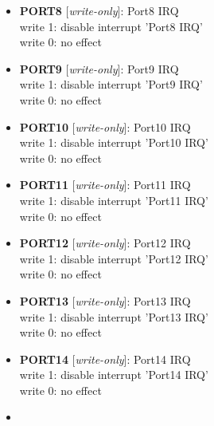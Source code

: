\begin{itemize}
\begin{small}
write 1: disable interrupt 'Port7 IRQ'\\write 0: no effect
\end{small}
\item \begin{small}
{\bf 
PORT8
} [\emph{write-only}]: Port8 IRQ
\\
write 1: disable interrupt 'Port8 IRQ'\\write 0: no effect
\end{small}
\item \begin{small}
{\bf 
PORT9
} [\emph{write-only}]: Port9 IRQ
\\
write 1: disable interrupt 'Port9 IRQ'\\write 0: no effect
\end{small}
\item \begin{small}
{\bf 
PORT10
} [\emph{write-only}]: Port10 IRQ
\\
write 1: disable interrupt 'Port10 IRQ'\\write 0: no effect
\end{small}
\item \begin{small}
{\bf 
PORT11
} [\emph{write-only}]: Port11 IRQ
\\
write 1: disable interrupt 'Port11 IRQ'\\write 0: no effect
\end{small}
\item \begin{small}
{\bf 
PORT12
} [\emph{write-only}]: Port12 IRQ
\\
write 1: disable interrupt 'Port12 IRQ'\\write 0: no effect
\end{small}
\item \begin{small}
{\bf 
PORT13
} [\emph{write-only}]: Port13 IRQ
\\
write 1: disable interrupt 'Port13 IRQ'\\write 0: no effect
\end{small}
\item \begin{small}
{\bf 
PORT14
} [\emph{write-only}]: Port14 IRQ
\\
write 1: disable interrupt 'Port14 IRQ'\\write 0: no effect
\end{small}
\item \begin{small}

\end{small}
\end{itemize}
